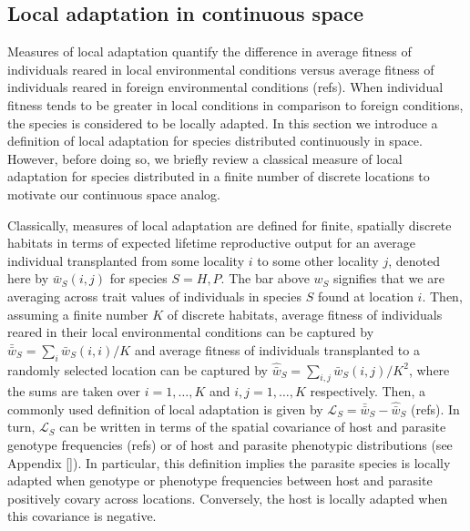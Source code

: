 \documentclass{article}
\begin{document}
\hypertarget{local-adaptation-in-continuous-space}{%
\subsection{\texorpdfstring{Local adaptation in continuous space
\label{la}}{Local adaptation in continuous space }}\label{local-adaptation-in-continuous-space}}

Measures of local adaptation quantify the difference in average fitness
of individuals reared in local environmental conditions versus average
fitness of individuals reared in foreign environmental conditions
(refs). When individual fitness tends to be greater in local conditions
in comparison to foreign conditions, the species is considered to be
locally adapted. In this section we introduce a definition of local
adaptation for species distributed continuously in space. However,
before doing so, we briefly review a classical measure of local
adaptation for species distributed in a finite number of discrete
locations to motivate our continuous space analog.

Classically, measures of local adaptation are defined for finite,
spatially discrete habitats in terms of expected lifetime reproductive
output for an average individual transplanted from some locality \(i\)
to some other locality \(j\), denoted here by \(\bar w_S(i,j)\) for
species \(S=H,P\). The bar above \(w_S\) signifies that we are averaging
across trait values of individuals in species \(S\) found at location
\(i\). Then, assuming a finite number \(K\) of discrete habitats,
average fitness of individuals reared in their local environmental
conditions can be captured by \(\bar{\bar w}_S=\sum_i\bar w_S(i,i)/K\)
and average fitness of individuals transplanted to a randomly selected
location can be captured by
\(\hat{\bar w}_S=\sum_{i,j }\bar w_S(i,j)/K^2\), where the sums are
taken over \(i=1,\dots,K\) and \(i,j=1,\dots,K\) respectively. Then, a
commonly used definition of local adaptation is given by
\(\mathcal L_S=\bar{\bar w}_S-\hat{\bar w}_S\) (refs). In turn,
\(\mathcal L_S\) can be written in terms of the spatial covariance of
host and parasite genotype frequencies (refs) or of host and parasite
phenotypic distributions (see Appendix \ref{}). In particular, this
definition implies the parasite species is locally adapted when genotype
or phenotype frequencies between host and parasite positively covary
across locations. Conversely, the host is locally adapted when this
covariance is negative.
\end{document}
